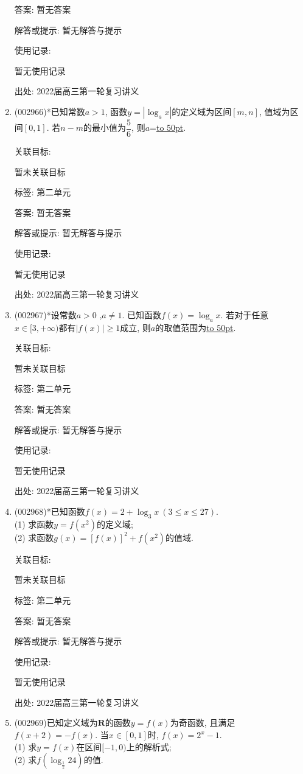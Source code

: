 \documentclass[10pt,a4paper]{article}
\newcommand{\blank}[1]{\underline{\hbox to #1pt{}}}
\begin{document}
\begin{enumerate}[1.]
答案: 暂无答案

解答或提示: 暂无解答与提示

使用记录:

暂无使用记录


出处: 2022届高三第一轮复习讲义
\item { (002966)}*已知常数$a>1$, 函数$y=|\log_ax|$的定义域为区间$[m,n]$, 值域为区间$[0,1]$. 若$n-m$的最小值为$\dfrac 56$, 则$a$=\blank{50}.


关联目标:

暂未关联目标



标签: 第二单元

答案: 暂无答案

解答或提示: 暂无解答与提示

使用记录:

暂无使用记录


出处: 2022届高三第一轮复习讲义
\item { (002967)}*设常数$a>0$ ,$a\ne 1$. 已知函数$f(x)=\log_ax$. 若对于任意$x\in [3,+\infty)$都有$|f(x)|\ge 1$成立, 则$a$的取值范围为\blank{50}.


关联目标:

暂未关联目标



标签: 第二单元

答案: 暂无答案

解答或提示: 暂无解答与提示

使用记录:

暂无使用记录


出处: 2022届高三第一轮复习讲义
\item { (002968)}*已知函数$f(x)=2+\log_3 x\ (3\le x\le 27)$.\\
(1) 求函数$y=f(x^2)$的定义域;\\
(2) 求函数$g(x)={[f(x)]}^2+f(x^2)$的值域.


关联目标:

暂未关联目标



标签: 第二单元

答案: 暂无答案

解答或提示: 暂无解答与提示

使用记录:

暂无使用记录


出处: 2022届高三第一轮复习讲义
\item { (002969)}已知定义域为$\mathbf{R}$的函数$y=f(x)$为奇函数, 且满足$f(x+2)=-f(x)$. 当$x\in [0,1]$时, $f(x)=2^x-1$.\\
(1) 求$y=f(x)$在区间$[-1,0)$上的解析式;\\
(2) 求$f(\log_{\frac 12}24)$的值.



\end{enumerate}
\end{document}
